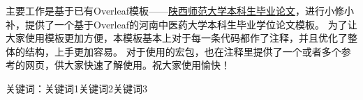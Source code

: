 \begin{center}
    {\heiti\thesisTitle}

    {\vspace{1em}\songti\thesisAuthor}

    {\vspace{1em}}
\end{center}
\vspace{1em}
\begin{spacing}{1.25}  %
{\songti{}
主要工作是基于已有Overleaf模板——\href{https://www.overleaf.com/latex/templates/shan-xi-shi-fan-da-xue-ben-ke-sheng-bi-ye-lun-wen-texmo-ban/rkxzpttqqzyt}{陕西师范大学本科生毕业论文}，进行小修小补，提供了一个基于Overleaf的河南中医药大学本科生毕业学位论文模板。
为了让大家使用模板更加方便，本模板基本上对于每一条代码都作了注释，并且优化了整体的结构，上手更加容易。
对于使用的宏包，也在注释里提供了一个或者多个参考的网页，供大家快速了解使用。祝大家使用愉快！}
\end{spacing}

关键词：关键词1\quad 关键词2\quad 关键词3  %

\clearpage									%
